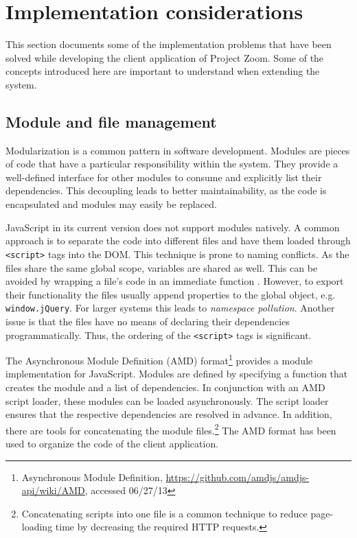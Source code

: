 \chapter{Implementation considerations}

This section documents some of the implementation problems that have been solved while developing the client application of Project Zoom. Some of the concepts introduced here are important to understand when extending the system.

\section{Module and file management}
Modularization is a common pattern in software development. Modules are pieces of code that have a particular responsibility within the system. They provide a well-defined interface for other modules to consume and explicitly list their dependencies. This decoupling leads to better maintainability, as the code is encapsulated and modules may easily be replaced. \cite{Osmani_2011}

JavaScript in its current version does not support modules natively. A common approach is to separate the code into different files and have them loaded through \texttt{<script>} tags into the DOM. This technique is prone to naming conflicts. As the files share the same global scope, variables are shared as well. This can be avoided by wrapping a file's code in an immediate function \cite{Resig_2013}. However, to export their functionality the files usually append properties to the global object, e.g. \texttt{window.jQuery}. For larger systems this leads to \textit{namespace pollution}. Another issue is that the files have no means of declaring their dependencies programmatically. Thus, the ordering of the \texttt{<script>} tags is significant.

The Asynchronous Module Definition (AMD) format\footnote{Asynchronous Module Definition, \url{https://github.com/amdjs/amdjs-api/wiki/AMD}, accessed 06/27/13} provides a module implementation for Ja\-va\-Script. Modules are defined by specifying a function that creates the module and a list of dependencies. In conjunction with an AMD script loader, these modules can be loaded asynchronously. The script loader ensures that the respective dependencies are resolved in advance. In addition, there are tools for concatenating the module files.\footnote{Concatenating scripts into one file is a common technique to reduce page-loading time by decreasing the required HTTP requests.} The AMD format has been used to organize the code of the client application.


